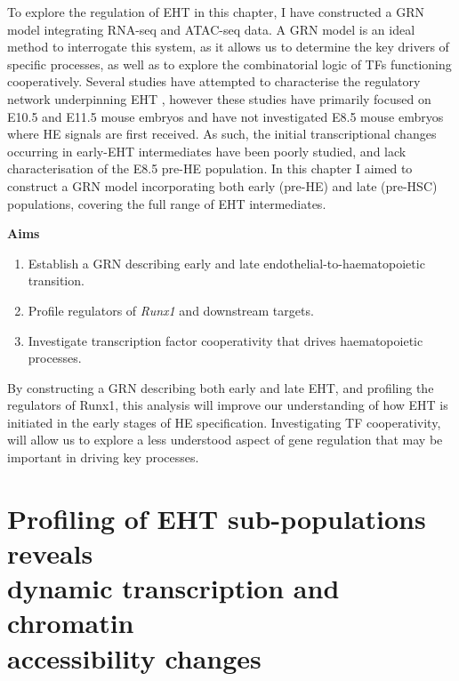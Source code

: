 To explore the regulation of EHT in this chapter, I have constructed a GRN model integrating RNA-seq and ATAC-seq data. A GRN model is an ideal method to interrogate this system, as it allows us to determine the key drivers of specific processes, as well as to explore the combinatorial logic of TFs functioning cooperatively. Several studies have attempted to characterise the regulatory network underpinning EHT \citep{goode_dynamic_2016, baron_single-cell_2018, zhu_developmental_2020, zeng_tracing_2019, bergiers_single-cell_2018, gao_transcriptional_2020}, however these studies have primarily focused on E10.5 and E11.5 mouse embryos and have not investigated E8.5 mouse embryos where HE signals are first received. As such, the initial transcriptional changes occurring in early-EHT intermediates have been poorly studied, and lack characterisation of the E8.5 pre-HE population. In this chapter I aimed to construct a GRN model incorporating both early (pre-HE) and late (pre-HSC) populations, covering the full range of EHT intermediates.

\noindent
\textbf{Aims}
 
\vspace*{-5mm}
\begin{enumerate}
    \item Establish a GRN describing early and late endothelial-to-haematopoietic transition. 
    \item Profile regulators of \textit{Runx1} and downstream targets. 
    \item Investigate transcription factor cooperativity that drives haematopoietic processes. 
\end{enumerate}

\vspace*{-5mm}
By constructing a GRN describing both early and late EHT, and profiling the regulators of Runx1, this analysis will improve our understanding of how EHT is initiated in the early stages of HE specification. Investigating TF cooperativity, will allow us to explore a less understood aspect of gene regulation that may be important in driving key processes.

\clearpage

\section[Profiling of EHT sub-populations reveals dynamic transcription and chromatin accessibility changes]{\label{ch3:overview}Profiling of EHT sub-populations reveals\\dynamic transcription and chromatin\\accessibility changes}

